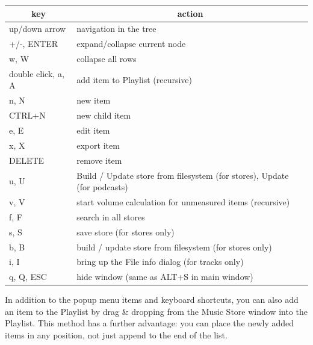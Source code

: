 \documentclass[10pt,english]{article}
\begin{document}
\begin{center}\begin{tabular}{|m{4cm}|m{10cm}|}\hline \multicolumn{1}{|c|}{\textbf{key}} & \multicolumn{1}{c|}{\textbf{action}} \\ \hline \hline 

up/down arrow&
navigation in the tree
\\ \hline 

+/-, ENTER&
expand/collapse current node
\\ \hline 

w, W&
collapse all rows
\\ \hline 
\hline 

double click, a, A&
add item to Playlist (recursive)
\\ \hline 

n, N&
new item
\\ \hline 

CTRL+N&
new child item
\\ \hline 

e, E&
edit item
\\ \hline 

x, X&
export item
\\ \hline 

DELETE&
remove item
\\ \hline 
\hline 

u, U&
Build / Update store from filesystem (for stores), Update (for podcasts)
\\ \hline 

v, V&
start volume calculation for unmeasured items (recursive)
\\ \hline 

f, F&
search in all stores
\\ \hline 
\hline 

s, S&
save store (for stores only)
\\ \hline 

b, B&
build / update store from filesystem (for stores only)
\\ \hline 

i, I&
bring up the File info dialog (for tracks only)
\\ \hline 
\hline 

q, Q, ESC&
hide window (same as ALT+S in main window)
\\ \hline 
\end{tabular}\end{center}



\noindent In addition to the popup menu items and keyboard shortcuts,
you can also add an item to the Playlist by drag \&
dropping from the Music Store window into the Playlist. This
method has a further advantage: you can place the newly added
items in any position, not just append to the end of the
list.
\end{document}
